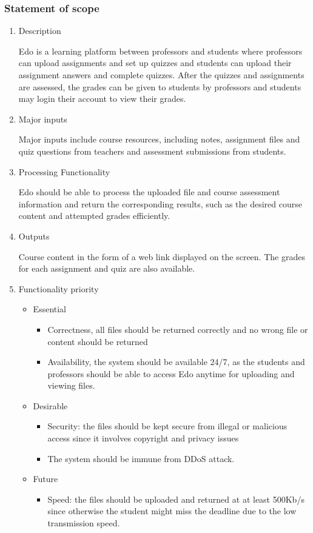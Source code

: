 \documentclass[paper=a4, fontsize=11pt]{scrartcl}
\numberwithin{equation}{section}		%
\numberwithin{figure}{section}			%
\numberwithin{table}{section}				%
\begin{document}
\subsubsection{Statement of scope}
\begin{enumerate}
	\item Description
	\par Edo is a learning platform between professors and students where professors can upload assignments and set up quizzes and students can upload their assignment answers and complete quizzes. After the quizzes and assignments are assessed, the grades can be given to students by professors and students may login their account to view their grades.
	\item Major inputs
	\par Major inputs include course resources, including notes, assignment files and quiz questions from teachers and assessment submissions from students.
	\item Processing Functionality
	\par Edo should be able to process the uploaded file and course assessment information and return the corresponding results, such as the desired course content and attempted grades efficiently.
	\item Outputs
	\par Course content in the form of a web link displayed on the screen. The grades for each assignment and quiz are also available. 
	\item Functionality priority
	\begin{itemize}
		\item Essential
		\begin{itemize}
			\item Correctness, all files should be returned correctly and no wrong file or content should be returned
			\item Availability, the system should be available 24/7, as the students and professors should be able to access Edo anytime for uploading and viewing files.
		\end{itemize}
		\item Desirable
		\begin{itemize}
			\item Security: the files should be kept secure from illegal or malicious access since it involves copyright and privacy issues
			\item The system should be immune from DDoS attack.
		\end{itemize}
		\item Future
		\begin{itemize}
			\item Speed: the files should be uploaded and returned at at least 500Kb/s since otherwise the student might miss the deadline due to the low transmission speed.
		\end{itemize}
	\end{itemize}	
\end{enumerate}
\end{document}
